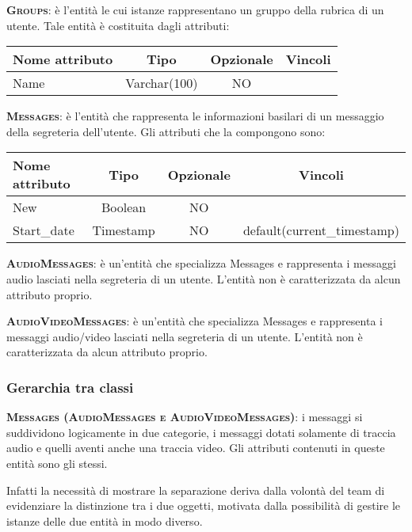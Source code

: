 \begin{description}
	\item{\scshape\bfseries Groups}: è l'entità le cui istanze rappresentano un gruppo della rubrica di un utente. Tale entità è costituita dagli attributi:

\begin{center}
\begin{tabular}{lccc}
\toprule
Nome attributo & Tipo & Opzionale & Vincoli\\
\midrule
Name & Varchar(100) & NO &\\
\bottomrule
\end{tabular}
\end{center}	
	
	\item{\scshape\bfseries Messages}: è l'entità che rappresenta le informazioni basilari di un messaggio della segreteria dell'utente. Gli attributi che la compongono sono:

\begin{center}
\begin{tabular}{lccc}
\toprule
Nome attributo & Tipo & Opzionale & Vincoli\\
\midrule
New & Boolean & NO & \\
Start\_date & Timestamp & NO & default(current\_timestamp) \\
\bottomrule
\end{tabular}
\end{center}	
	
	\item{\scshape\bfseries AudioMessages}: è un'entità che specializza Messages e rappresenta i messaggi audio lasciati nella segreteria di un utente. L'entità non è caratterizzata da alcun attributo proprio.
	
	\item{\scshape\bfseries AudioVideoMessages}: è un'entità che specializza Messages e rappresenta i messaggi audio/video lasciati nella segreteria di un utente.  L'entità non è caratterizzata da alcun attributo proprio.	
	
\end{description}

\subsubsection{Gerarchia tra classi}

\begin{description}
	\item{\scshape\bfseries Messages (AudioMessages e AudioVideoMessages)}: i messaggi si suddividono logicamente in due categorie, i messaggi dotati solamente di traccia audio e quelli aventi anche una traccia video. Gli attributi contenuti in queste entità sono gli stessi.
	
Infatti la necessità di mostrare la separazione deriva dalla volontà del team di evidenziare la distinzione tra i due oggetti, motivata dalla possibilità di gestire le istanze delle due entità in modo diverso.
\end{description}

